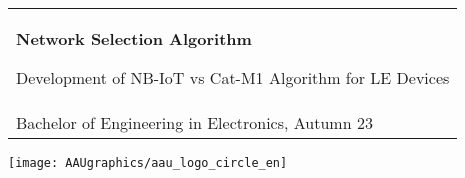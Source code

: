 %
\begin{titlepage}
\vspace*{\fill}
  \noindent%
  {\color{white}\colorbox{aaublue}{\begin{tabular}{@{}p{\textwidth}@{}}
    \begin{center}
    \Huge{\textbf{
      Network Selection Algorithm%
    }}
    \end{center}
    \begin{center}
      \Large{
        Development of NB-IoT vs Cat-M1 Algorithm for LE Devices  %
      }
    \end{center}
    \vspace{0.2cm}
   \begin{center}
    {\Large
      Rikke Udengaard%
    }\\
    \vspace{0.2cm}
    {\large
      Bachelor of Engineering in Electronics, Autumn 23%
    }
   \end{center}
   \vspace{0.2cm}
   \begin{center}
    {\Large
      Bachelor Project
    }
   \end{center}
  \end{tabular}}}
  \vfill
  \begin{center}
    \texttt{[image: AAUgraphics/aau\_logo\_circle\_en]}%
  \end{center}
\end{titlepage}
\clearpage
{}